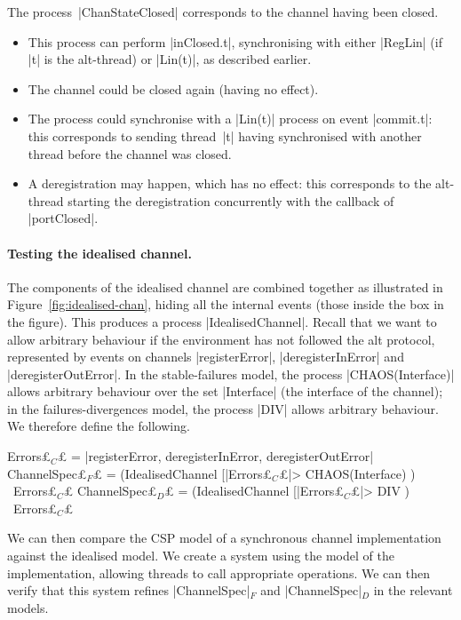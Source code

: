 
The process~|ChanStateClosed| 
corresponds to the channel having been closed.
%
\begin{itemize}
\item This process can perform |inClosed.t|, synchronising with either
  |RegLin| (if |t| is the alt-thread) or |Lin(t)|, as described earlier.

\item The channel could be closed again (having no effect).

\item The process could synchronise with a |Lin(t)| process on event
  |commit.t|: this corresponds to sending thread~|t| having synchronised with
  another thread before the channel was closed. 

\item A deregistration may happen, which has no effect: this corresponds to
  the alt-thread starting the deregistration concurrently with the callback of
  |portClosed|. 
\end{itemize}


\paragraph{Testing the idealised channel.}

The components of the idealised channel are combined together as illustrated
in Figure~\ref{fig:idealised-chan}, hiding all the internal events (those
inside the box in the figure).  This produces a process |IdealisedChannel|.
Recall that we want to allow arbitrary behaviour if the environment has not
followed the alt protocol, represented by events on channels |registerError|,
|deregisterInError| and |deregisterOutError|.  In the stable-failures model,
the process |CHAOS(Interface)| allows arbitrary behaviour over the set
|Interface| (the interface of the channel); in the failures-divergences model,
the process |DIV| allows arbitrary behaviour.  We therefore define the
following.
%
\begin{cspm}
Errors£$_C$£ = {|registerError, deregisterInError, deregisterOutError|}
ChannelSpec£$_F$£ = (IdealisedChannel [|Errors£$_C$£|> CHAOS(Interface) ) \ Errors£$_C$£
ChannelSpec£$_D$£ = (IdealisedChannel [|Errors£$_C$£|> DIV ) \ Errors£$_C$£
\end{cspm}

We can then compare the CSP model of a synchronous channel implementation
against the idealised model.  We create a system using the model of the
implementation, allowing threads to call appropriate operations.  We can then
verify that this system refines |ChannelSpec|$_F$ and |ChannelSpec|$_D$ in the
relevant models.

